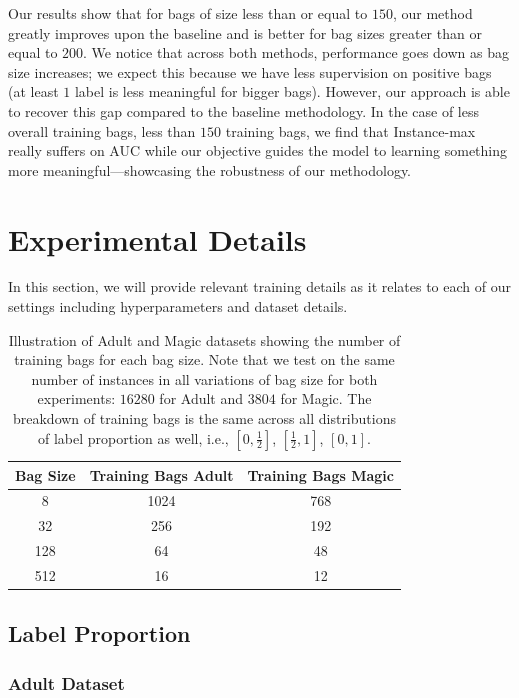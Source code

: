 \documentclass{article}
\begin{document}
Our results show that for bags of size less than or equal to $150$, our method greatly improves upon the baseline and is better for bag sizes greater than or equal to $200$. We notice that across both methods, performance goes down as bag size increases; we expect this because we have less supervision on positive bags (at least $1$ label is less meaningful for bigger bags). However, our approach is able to recover this gap compared to the baseline methodology. In the case of less overall training bags, less than $150$ training bags, we find that Instance-max really suffers on AUC while our objective guides the model to learning something more meaningful—showcasing the robustness of our methodology.
\section{Experimental Details}
In this section, we will provide relevant training details as it relates to each of our settings including hyperparameters and dataset details.
\begin{table}[h]
    \centering
     \caption{Illustration of Adult and Magic datasets showing the number of training bags for each bag size. Note that we test on the same number of instances in all variations of bag size for both experiments: $16280$ for Adult and $3804$ for Magic. The breakdown of training bags is the same across all distributions of label proportion as well, i.e., $[0, \frac{1}{2}]$, $[\frac{1}{2}, 1]$, $[0, 1]$.  }
    \begin{tabular}{ccc}
        \toprule
        Bag Size & Training Bags Adult & Training Bags Magic \\
         \midrule
         8 & 1024 & 768\\
         32 & 256 & 192\\
         128 & 64 & 48\\
         512 & 16 & 12\\
        \bottomrule
    \end{tabular}
   
    \label{tab:adult magic dataset}
\end{table}

\subsection{Label Proportion}
\subsubsection{Adult Dataset}
\end{document}
